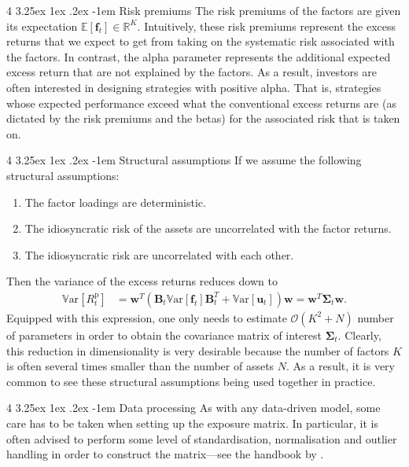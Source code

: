 \documentclass[12pt]{article}
\makeatletter
\renewcommand\paragraph{%
	\@startsection{paragraph}
	{4}
	{\z@}
	{3.25ex \@plus1ex \@minus.2ex}
	{-1em}
	{\normalfont\normalsize\bfseries\maybe@addperiod}%
}
\newcommand{\maybe@addperiod}[1]{%
	#1\@addpunct{.}%
}
\makeatother
\begin{document}
\paragraph{Risk premiums} The risk premiums of the factors are given its expectation $\mathbb{E}[\mathbf{f}_t] \in \mathbb{R}^K$. Intuitively, these risk premiums represent the excess returns that we expect to get from taking on the systematic risk associated with the factors. In contrast, the alpha parameter represents the additional expected excess return that are not explained by the factors. As a result, investors are often interested in designing strategies with positive alpha. That is, strategies whose expected performance exceed what the conventional excess returns are (as dictated by the risk premiums and the betas) for the associated risk that is taken on.

\paragraph{Structural assumptions} If we assume the following structural assumptions:
\begin{enumerate}
	\item The factor loadings are deterministic.
	\item The idiosyncratic risk of the assets are uncorrelated with the factor returns.
	\item The idiosyncratic risk are uncorrelated with each other.
\end{enumerate}
Then the variance of the excess returns reduces down to
\begin{align}
	\mathbb{V}\text{ar}[R_t^{\text{p}}]
	&= \mathbf{w}^T \left( \mathbf{B}_t\mathbb{V}\text{ar}[\mathbf{f}_t] \mathbf{B}_t^T + \mathbb{V}\text{ar}[\mathbf{u}_t]\right) \mathbf{w}
	= \mathbf{w}^T \boldsymbol{\Sigma}_t \mathbf{w}.
\end{align}
Equipped with this expression, one only needs to estimate $\mathcal{O}(K^2 + N)$ number of parameters in order to obtain the covariance matrix of interest $\boldsymbol{\Sigma}_t$. Clearly, this reduction in dimensionality is very desirable because the number of factors $K$ is often several times smaller than the number of assets $N$. As a result, it is very common to see these structural assumptions being used together in practice. 

\paragraph{Data processing} As with any data-driven model, some care has to be taken when setting up the exposure matrix. In particular, it is often advised to perform some level of standardisation, normalisation and outlier handling in order to construct the matrix---see the handbook by \cite{axioma2007}.
\end{document}
